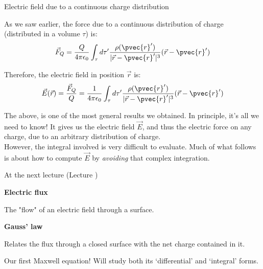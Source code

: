 \begin{frame}{Electric field due to a continuous charge distribution}

As we saw earlier, the force due to a continuous distribution of charge (distributed in a volume $\tau$) is:
\begin{equation*}
   \vec{F}_{Q} = \frac{Q}{4\pi\epsilon_0} \int_{\tau}
      d\tau^{\prime} \frac{\rho({\pvec{r}'})}{|\vec{r}-\pvec{r}'|^{3}} (\vec{r}-\pvec{r}')
\end{equation*}

Therefore, the electric field in position $\vec{r}$ is:
\begin{equation*}
   \vec{E}(\vec{r}) = \frac{\vec{F}_{Q}}{Q} = \frac{1}{4\pi\epsilon_0} \int_{\tau}
      d\tau^{\prime} \frac{\rho({\pvec{r}'})}{|\vec{r}-\pvec{r}'|^{3}} (\vec{r}-\pvec{r}')
\end{equation*}

The above, is one of the most general results we obtained. In principle, it's all we need to know!
It gives us the electric field $\vec{E}$, and thus the electric force on any charge,
due to an arbitrary distribution of charge.\\

\vspace{0.2cm}
However, the integral involved is very difficult to evaluate.
Much of what follows is about how to compute $\vec{E}$ by {\em avoiding} that complex integration.

\end{frame}




%
%

\renewcommand{\lecturesummarytitle}{Main points to remember }


%
%

\begin{frame}{At the next lecture (Lecture \nextlecture)}

  \begin{itemize}
  {\small
  \item {\bf Electric flux}
    \begin{itemize}
    {\scriptsize
       \item The "flow" of an electric field through a surface.
    }
    \end{itemize}

  \item {\bf Gauss' law}
    \begin{itemize}
    {\scriptsize
       \item Relates the flux through a closed surface with the net charge contained in it.
       \item Our first Maxwell equation! Will study both its `differential' and `integral' forms.
    }
    \end{itemize}
  }
  \end{itemize}

\end{frame}

%
%


